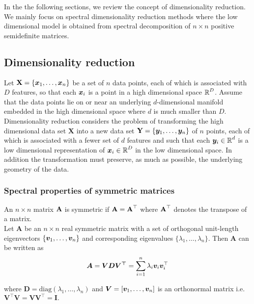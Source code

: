 


In the the following sections, we review the concept of dimensionality reduction.
We mainly focus on spectral dimensionality reduction methods where the 
low dimensional model is obtained from spectral decomposition of $n \times n$
positive semidefinite matrices.

\subsection{Dimensionality reduction}
Let $\textbf{X} = \displaystyle \{\boldsymbol{x}_{1}, \ldots , \boldsymbol{x}_{n} \}$
be a set of $n$ data points, each of which is associated with $D$ features, so that each $\boldsymbol{x}_{i}$ is a point in a high dimensional space $\operatorname{\mathbb{R}}^{D}$. Assume that the data points lie on or near an underlying $d$-dimensional manifold embedded in the high dimensional space where $d$ is much smaller than $D$. Dimensionality reduction considers the problem of  transforming the high dimensional data set
$\textbf{X}$ into a new data set $\textbf{Y} = \displaystyle \{ \boldsymbol{y}_{1}, \ldots, \boldsymbol{y}_{n} \}$  of $n$ points, each of which is associated
with a fewer set of $d$ features and such that each $\boldsymbol{y}_{i} \in \operatorname{\mathbb{R}}^{d}$ is a low dimensional representation of $\boldsymbol{x}_{i} \in \operatorname{\mathbb{R}}^{D}$ in the low dimensional space. In addition the transformation must preserve, as much as possible, the underlying geometry of the data.



\subsubsection{Spectral properties of symmetric matrices}
An $n\times n$ matrix $\textbf{A}$ is symmetric if $\textbf{A} = \textbf{A}^{\top}$
where $\textbf{A}^{\top}$ denotes the transpose of a matrix.\\
Let \textbf{A} be an $n\times n$ real symmetric matrix with a set of 
orthogonal unit-length eigenvectors  $\{ \boldsymbol{v}_{1}, \ldots, \boldsymbol{v}_{n} \}$ and corresponding eigenvalues $\{\lambda_{1}, \ldots, \lambda_{n} \}.$ 
Then \textbf{A} can be written as 
\[ 
\bm{A} = \bm{VDV^{\top}} = 
\sum_{i=1}^{n} \lambda_{i} \boldsymbol{v}_{i} \boldsymbol{v}_{i}^{\top} 
\]

where $\bm{D} = \text{diag}(\lambda_{1}, \ldots, \lambda_{n})$ and  $ \bm{V} = [\boldsymbol{v}_{1}, \ldots, \boldsymbol{v}_{n}]$ is an orthonormal matrix i.e.
$\bm{V^{\top}V  = VV^{\top} = I}.$\\

